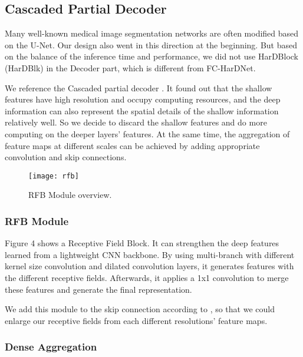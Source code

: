 \documentclass{article}
\begin{document}
\subsection{Cascaded Partial Decoder}
    \vspace{4mm}
    \hspace*{0.5cm}Many well-known medical image segmentation networks are often modified based on the U-Net. 
    Our design also went in this direction at the beginning. 
    But based on the balance of the inference time and performance, we did not use HarDBlock (HarDBlk) in the Decoder part, which is different from FC-HarDNet.
    
    \vspace{4mm}
    We reference the Cascaded partial decoder \cite{wu2019cascaded}. 
    It found out that the shallow features have high resolution and occupy computing resources, and the deep information can also represent the spatial details of the shallow information relatively well. 
    So we decide to discard the shallow features and do more computing on the deeper layers’ features. 
    At the same time, the aggregation of feature maps at different scales can be achieved by adding appropriate convolution and skip connections.

\begin{figure}[htb]
\centering
\texttt{[image: rfb]}
\caption{RFB Module overview.}
\label{fig:rfb}
\end{figure}

\subsubsection{RFB Module} 
    \vspace{4mm}
    \hspace*{0.5cm}Figure 4 shows a Receptive Field Block\cite{liu2018receptive}. It can strengthen the deep features learned from a lightweight CNN backbone.
    By using multi-branch with different kernel size convolution and dilated convolution layers, it generates features with the different receptive fields. Afterwards, it applies a 1x1 convolution to merge these features and generate the final representation.
    
    \vspace{4mm}
    We add this module to the skip connection according to \cite{wu2019cascaded}, so that we could enlarge our receptive fields from each different resolutions’ feature maps.

\subsubsection{Dense Aggregation}
\end{document}
